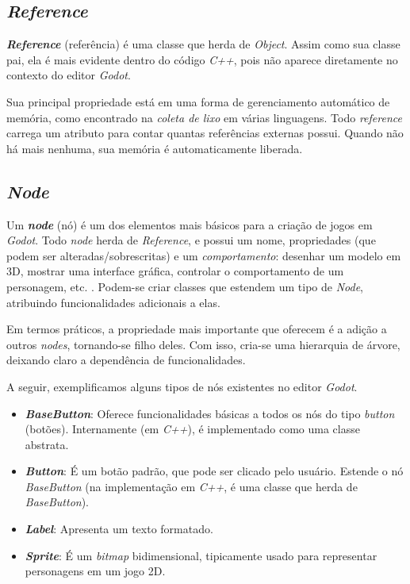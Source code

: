 
\subsection{\textit{Reference}}

\textbf{\textit{Reference}} (referência) é uma classe que herda de \textit{Object}. Assim como sua classe pai, ela é mais evidente dentro do código \textit{C++}, pois não aparece diretamente no contexto do editor \textit{Godot}.

Sua principal propriedade está em uma forma de gerenciamento automático de memória, como encontrado na \textit{coleta de lixo} em várias linguagens. Todo \textit{reference} carrega um atributo para contar quantas referências externas possui. Quando não há mais nenhuma, sua memória é automaticamente liberada.


\subsection{\textit{Node}}
\label{godotNode}

Um \textbf{\textit{node}} (nó) é um dos elementos mais básicos para a criação de jogos em \textit{Godot}. Todo \textit{node} herda de \textit{Reference}, e possui um nome, propriedades (que podem ser alteradas/sobrescritas) e um \emph{comportamento}: desenhar um modelo em 3D, mostrar uma interface gráfica, controlar o comportamento de um personagem, etc. \citep{godotNode}. Podem-se criar classes que estendem um tipo de \textit{Node}, atribuindo funcionalidades adicionais a elas.

Em termos práticos, a propriedade mais importante que oferecem é a adição a outros \textit{nodes}, tornando-se filho deles. Com isso, cria-se uma hierarquia de árvore, deixando claro a dependência de funcionalidades.

A seguir, exemplificamos alguns tipos de nós existentes no editor \textit{Godot}.

\begin{itemize}
\item \textbf{\textit{BaseButton}}: Oferece funcionalidades básicas a todos os nós do tipo \textit{button} (botões). Internamente (em \textit{C++}), é implementado como uma classe abstrata.

\item \textbf{\textit{Button}}: É um botão padrão, que pode ser clicado pelo usuário. Estende o nó \textit{BaseButton} (na implementação em \textit{C++}, é uma classe que herda de \textit{BaseButton}).

\item \textbf{\textit{Label}}: Apresenta um texto formatado.

\item \textbf{\textit{Sprite}}: É um \textit{bitmap} bidimensional, tipicamente usado para representar personagens em um jogo 2D.
\end{itemize}

